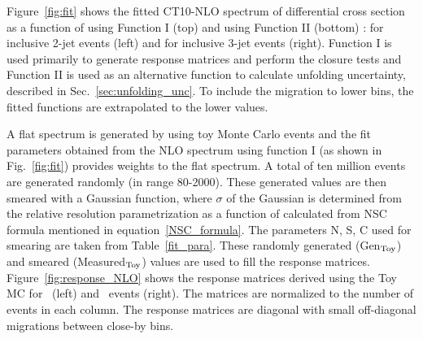 Figure~\ref{fig:fit} shows the fitted CT10-NLO  spectrum of differential cross section as a function of \httwo using Function I (top) and using Function II (bottom) : for inclusive 2-jet events (left) and for inclusive 3-jet events (right). Function I is used primarily to generate response matrices and perform the closure tests and Function II is used as an alternative function to calculate unfolding uncertainty, described in Sec.~\ref{sec:unfolding_unc}. To include the migration to lower bins, the fitted functions are extrapolated to the lower \httwo values.

A flat \httwo spectrum is generated by using toy Monte Carlo events and the fit parameters obtained from the NLO spectrum using function I (as shown in Fig.~\ref{fig:fit}) provides weights to the flat spectrum. A total of ten million events are generated randomly (in \httwo range 80-2000). These generated values are then smeared with a Gaussian function, where $\sigma$ of the Gaussian is determined from the relative resolution parametrization as a function of \httwo calculated from NSC formula mentioned in equation~\ref{NSC_formula}. The parameters N, S, C used for smearing are taken from Table~\ref{fit_para}. These randomly generated (Gen$_{\rm Toy}$) and smeared (Measured$_{\rm Toy}$) values are used to fill the response matrices. Figure~\ref{fig:response_NLO} shows the response matrices derived using the Toy MC for \njt~(left) and \njth~events (right). The matrices are normalized to the number of events in each column. The response matrices are diagonal with small off-diagonal migrations between close-by \httwo bins.

